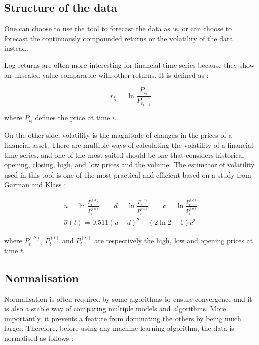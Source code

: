 \documentclass[11pt,a4paper,oneside]{book}
\begin{document}
\subsection{Structure of the data}

One can choose to use the tool to forecast the data as is, or can choose to forecast the continuously compounded returns or the volatility of the data instead.

Log returns are often more interesting for financial time series because they show an unscaled value comparable with other returns. It is defined as :

\begin{equation}
r_{t_i} = \ln\frac{P_{t_i}}{P_{t_{i-1}}}
\end{equation}

where $P_{t_i}$ defines the price at time $i$.

On the other side, volatility is the magnitude of changes in the prices of a financial asset. There are multiple ways of calculating the volatility of a financial time series, and one of the most suited should be one that considers historical opening, closing, high, and low
prices and the volume. The estimator of volatility used in this tool is one of the most practical and efficient based on a study from Garman and Klass \cite{garm}:

\begin{equation}
\begin{matrix}
u = \ln\frac{P_t^{(h)}}{P_t^{(o)}} \qquad
d = \ln\frac{P_t^{(l)}}{P_t^{(o)}} \qquad
c = \ln\frac{P_t^{(c)}}{P_t^{(o)}} \\
\hat{\sigma}\left ( t \right ) = 0.511\left ( u - d \right )^2 - \left ( 2\ln 2 - 1 \right )c^2
\end{matrix}
\end{equation}\label{volatility}

where $P_t^{(h)}$, $P_t^{(l)}$ and $P_t^{(c)}$ are respectively the high, low and opening prices at time $t$.


\subsection{Normalisation}

Normalisation is often required by some algorithms to ensure convergence and it is also a stable way of comparing multiple models and algorithms. More importantly, it prevents a feature from dominating the others by being much larger. Therefore, before using any machine learning algorithm, the data is normalised as follows : 
\end{document}

